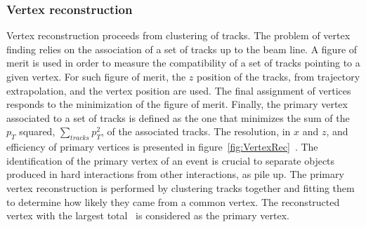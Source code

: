 \subsubsection{Vertex reconstruction}

Vertex reconstruction proceeds from clustering of tracks. The problem of vertex finding relies on the association of a set of tracks up to the beam line. A figure of merit is used in order to measure the compatibility of a set of tracks pointing to a given vertex. For such figure of merit, the $z$ position of the tracks, from trajectory extrapolation, and the vertex position are used. The final assignment of vertices responds to the minimization of the figure of merit. Finally, the primary vertex associated to a set of tracks is defined as the one that minimizes the sum of the $p_{T}$ squared, $\sum_{tracks}p_{T}^{2}$, of the associated tracks. The resolution, in $x$ and $z$, and efficiency of primary vertices is presented in figure~\ref{fig:VertexRec}~\cite{Chatrchyan:2014fea}. The identification of the primary vertex of an event is crucial to separate objects produced in hard interactions from other interactions, as pile up. The primary vertex reconstruction is performed by clustering tracks together and fitting them to determine how likely they came from a common vertex. The reconstructed vertex with the largest total \pt~is considered as the primary vertex.

